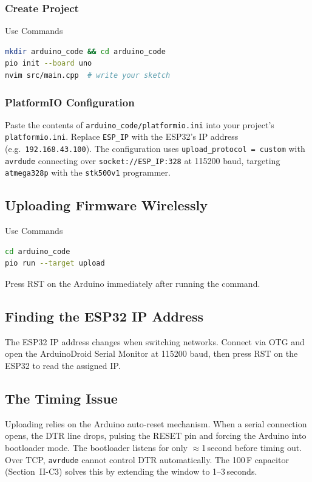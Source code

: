 \documentclass[conference]{IEEEtran}
\begin{document}
\subsubsection{Create Project}
Use Commands
\begin{lstlisting}[language=bash, caption={Initialize Arduino project}]
mkdir arduino_code && cd arduino_code
pio init --board uno
nvim src/main.cpp  # write your sketch
\end{lstlisting}

\subsubsection{PlatformIO Configuration}
Paste the contents of \texttt{arduino\_code/platformio.ini} into your
project's \texttt{platformio.ini}.
Replace \texttt{ESP\_IP} with the ESP32's IP address
(e.g.\ \texttt{192.168.43.100}).
The configuration uses \texttt{upload\_protocol = custom} with \texttt{avrdude}
connecting over \texttt{socket://ESP\_IP:328} at 115200 baud, targeting
\texttt{atmega328p} with the \texttt{stk500v1} programmer.

\subsection{Uploading Firmware Wirelessly}
Use Commands
\begin{lstlisting}[language=bash, caption={Build and upload}]
cd arduino_code
pio run --target upload
\end{lstlisting}

Press RST on the Arduino immediately after running the command.

\subsection{Finding the ESP32 IP Address}

The ESP32 IP address changes when switching networks.
Connect via OTG and open the ArduinoDroid Serial Monitor at 115200 baud,
then press RST on the ESP32 to read the assigned IP.

\subsection{The Timing Issue}

Uploading relies on the Arduino auto-reset mechanism.
When a serial connection opens, the DTR line drops, pulsing the RESET pin and
forcing the Arduino into bootloader mode.
The bootloader listens for only $\approx$1\,second before timing out.
Over TCP, \texttt{avrdude} cannot control DTR automatically.
The 100\,\textmu F capacitor (Section~II-C3) solves this by extending the
window to 1--3\,seconds.
\end{document}
